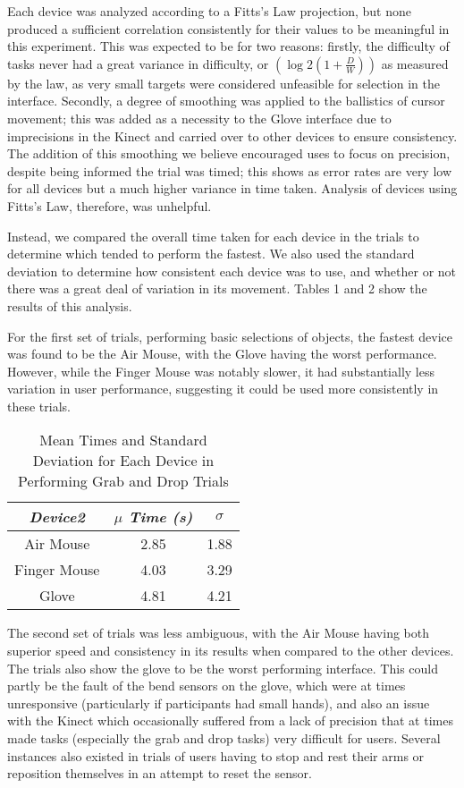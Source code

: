 Each device was analyzed according to a Fitts’s Law projection, but none produced a sufficient correlation consistently for their values to be meaningful in this experiment. This was expected to be for two reasons: firstly, the difficulty of tasks never had a great variance in difficulty, or \((\log{2}(1 + \frac{D}{W}))\) as measured by the law, as very small targets were considered unfeasible for selection in the interface. Secondly, a degree of smoothing was applied to the ballistics of cursor movement; this was added as a necessity to the Glove interface due to imprecisions in the Kinect and carried over to other devices to ensure consistency. The addition of this smoothing we believe encouraged uses to focus on precision, despite being informed the trial was timed; this shows as error rates are very low for all devices but a much higher variance in time taken. Analysis of devices using Fitts’s Law, therefore, was unhelpful.

Instead, we compared the overall time taken for each device in the trials to determine which tended to perform the fastest. We also used the standard deviation to determine how consistent each device was to use, and whether or not there was a great deal of variation in its movement. Tables 1 and 2 show the results of this analysis.

For the first set of trials, performing basic selections of objects, the fastest device was found to be the Air Mouse, with the Glove having the worst performance. However, while the Finger Mouse was notably slower, it had substantially less variation in user performance, suggesting it could be used more consistently in these trials.

\begin{table}
\centering
\begin{tabular}{c | c | c}
\emph{Device2} & \emph{$\mu$ Time (s)} & \emph{$\sigma$} \\
\hline
Air Mouse & 2.85 & 1.88 \\
Finger Mouse & 4.03 & 3.29 \\
Glove & 4.81 & 4.21 \\
\end{tabular}
\caption{Mean Times and Standard Deviation for Each Device in Performing Grab and Drop Trials}
\end{table}

The second set of trials was less ambiguous, with the Air Mouse having both superior speed and consistency in its results when compared to the other devices. The trials also show the glove to be the worst performing interface. This could partly be the fault of the bend sensors on the glove, which were at times unresponsive (particularly if participants had small hands), and also an issue with the Kinect which occasionally suffered from a lack of precision that at times made tasks (especially the grab and drop tasks) very difficult for users. Several instances also existed in trials of users having to stop and rest their arms or reposition themselves in an attempt to reset the sensor.

